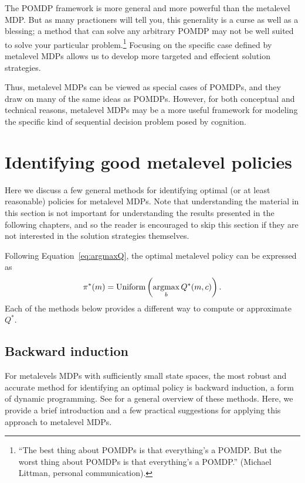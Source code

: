 The POMDP framework is more general and more powerful than the metalevel MDP. But as many practioners will tell you, this generality is a curse as well as a blessing; a method that can solve any arbitrary POMDP may not be well suited to solve your particular problem.\footnote{%
  ``The best thing about POMDPs is that everything's a POMDP. But the worst thing about POMDPs is that everything's a POMDP.'' (Michael Littman, personal communication).
} Focusing on the specific case defined by metalevel MDPs allows us to develop more targeted and effecient solution strategies.

Thus, metalevel MDPs can be viewed as special cases of POMDPs, and they draw on many of the same ideas as POMDPs. However, for both conceptual and technical reasons, metalevel MDPs may be a more useful framework for modeling the specific kind of sequential decision problem posed by cognition.


\section{Identifying good metalevel policies}\label{sec:computing}

Here we discuss a few general methods for identifying optimal (or at least reasonable) policies for metalevel MDPs. Note that understanding the material in this section is not important for understanding the results presented in the following chapters, and so the reader is encouraged to skip this section if they are not interested in the solution strategies themselves.

Following Equation~\ref{eq:argmaxQ}, the optimal metalevel policy can be expressed as
%
\begin{equation}
  \pi^*(m) = \text{Uniform}\left(\operatorname*{argmax}_b Q^*(m, c)\right).
\end{equation}
Each of the methods below provides a different way to compute or approximate $Q^*$.

\subsection{Backward induction}\label{sec:backinduct}

For metalevels MDPs with sufficiently small state spaces, the most robust and accurate method for identifying an optimal policy is backward induction, a form of dynamic programming. See \citet{puterman2014markov} for a general overview of these methods. Here, we provide a brief introduction and a few practical suggestions for applying this approach to metalevel MDPs.

